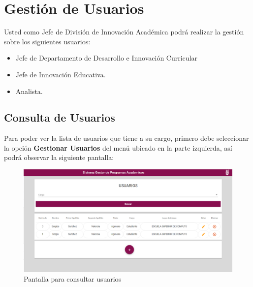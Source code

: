 
\chapter{Gestión de Usuarios}
    
    Usted como Jefe de División  de Innovación Académica podrá realizar la gestión sobre los siguientes usuarios:
    \begin{itemize}
        \item Jefe de Departamento de Desarrollo e Innovación Curricular 
        \item Jefe de Innovación Educativa.
        \item Analista.
    \end{itemize}
    

    \section{Consulta de Usuarios}
        
        Para poder ver la lista de usuarios que tiene a su cargo, primero debe seleccionar la opción \textbf{Gestionar Usuarios} del menú ubicado en la parte izquierda, así podrá observar la siguiente pantalla:
        
        \begin{figure}[!hbtp]
            \centering
            \hypertarget{consultarUs}{\includegraphics[width=0.7\linewidth]{images/SP5/Consultar-Usuario}}
            \caption{Pantalla para consultar usuarios}
            \label{consultarrh}
        \end{figure}
        
